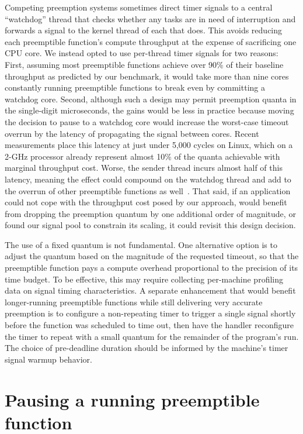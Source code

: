Competing preemption systems sometimes direct timer signals to a central ``watchdog''
thread that checks whether any tasks are in need of interruption and forwards a
signal to the kernel thread of each that does.  This avoids reducing each preemptible
function's compute throughput at the expense of sacrificing one CPU core.  We instead
opted to use per-thread timer signals for two reasons:  First, assuming most
preemptible functions achieve over 90\% of their baseline throughput as predicted by
our benchmark, it would take more than nine cores constantly running preemptible
functions to break even by committing a watchdog core.  Second, although such a
design may permit preemption quanta in the single-digit microseconds, the gains would
be less in practice because moving the decision to pause to a watchdog core would
increase the worst-case timeout overrun by the latency of propagating the signal
between cores.  Recent measurements place this latency at just under 5,000 cycles on
Linux, which on a 2-GHz processor already represent almost 10\% of the quanta
achievable with marginal throughput cost.  Worse, the sender thread incurs almost
half of this latency, meaning the effect could compound on the watchdog thread and
add to the overrun of other preemptible functions as well~\cite{Kaffes:nsdi2019}.
That said, if an application could not cope with the throughput cost posed by our
approach, would benefit from dropping the preemption quantum by one additional order
of magnitude, or found our signal pool to constrain its scaling, it could revisit
this design decision.

The use of a fixed quantum is not fundamental.  One alternative option is to adjust
the quantum based on the magnitude of the requested timeout, so that the preemptible
function pays a compute overhead proportional to the precision of its time budget.
To be effective, this may require collecting per-machine profiling data on signal
timing characteristics.  A separate enhancement that would benefit longer-running
preemptible functions while still delivering very accurate preemption is to
configure a non-repeating timer to trigger a single signal shortly before the
function was scheduled to time out, then have the handler reconfigure the timer to
repeat with a small quantum for the remainder of the program's run.  The choice of
pre-deadline duration should be informed by the machine's timer signal warmup
behavior.


\section{Pausing a running preemptible function}
\label{sec:libinger:pausing}

